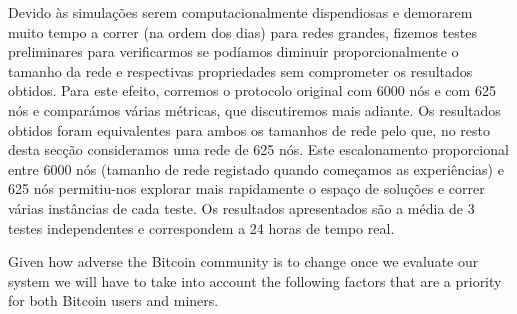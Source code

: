 Devido às simulações serem computacionalmente dispendiosas e demorarem muito tempo a correr (na ordem dos dias) para redes grandes, fizemos testes preliminares para verificarmos se podíamos diminuir proporcionalmente o tamanho da rede e respectivas propriedades sem comprometer os resultados obtidos.
Para este efeito, corremos o protocolo original com 6000 nós e com 625 nós e comparámos várias métricas, que discutiremos mais adiante.
Os resultados obtidos foram equivalentes para ambos os tamanhos de rede pelo que, no resto desta secção consideramos uma rede de 625 nós.
Este escalonamento proporcional entre 6000 nós (tamanho de rede registado quando começamos as experiências) e 625 nós permitiu-nos explorar mais rapidamente o espaço de soluções e correr várias instâncias de cada teste.
Os resultados apresentados são a média de 3 testes independentes e correspondem a 24 horas de tempo real.




Given how adverse the Bitcoin community is to change once we evaluate our system we will have to take into account the following factors that are a priority for both Bitcoin users and miners.

